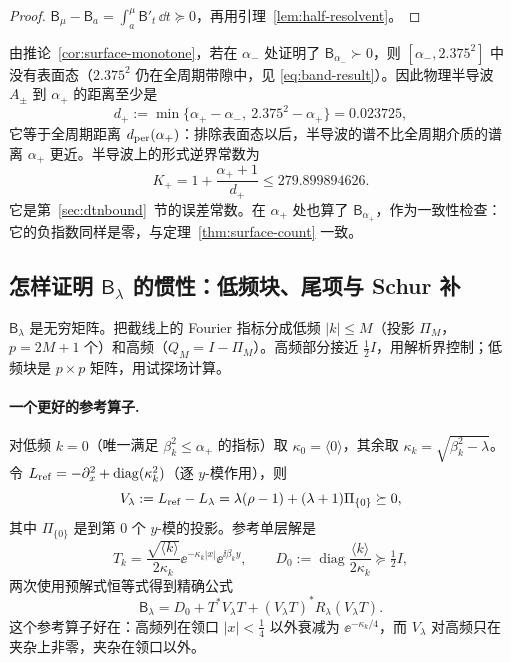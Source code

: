 \documentclass[11pt,a4paper,fontset=fandol]{ctexart}
\begin{document}
\begin{proof}
$\mathsf B_\mu-\mathsf B_a=\int_a^\mu\mathsf B'_t\,\dd t\succeq0$，再用引理~\ref{lem:half-resolvent}。
\end{proof}

由推论~\ref{cor:surface-monotone}，若在 $\alpha_-$ 处证明了 $\mathsf B_{\alpha_-}\succ0$，则 $[\alpha_-,2.375^2]$ 中没有表面态（$2.375^2$ 仍在全周期带隙中，见 \eqref{eq:band-result}）。因此物理半导波 $A_\pm$ 到 $\alpha_+$ 的距离至少是
\begin{equation}
\label{eq:dplus}
d_+:=\min\{\alpha_+-\alpha_-,\ 2.375^2-\alpha_+\}=0.023725,
\end{equation}
它等于全周期距离 $d_{\rm per}(\alpha_+)$：排除表面态以后，半导波的谱不比全周期介质的谱离 $\alpha_+$ 更近。半导波上的形式逆界常数为
\begin{equation}
\label{eq:Kplus}
K_+=1+\frac{\alpha_++1}{d_+}\le279.899894626 .
\end{equation}
它是第~\ref{sec:dtnbound}~节的误差常数。在 $\alpha_+$ 处也算了 $\mathsf B_{\alpha_+}$，作为一致性检查：它的负指数同样是零，与定理~\ref{thm:surface-count} 一致。

\subsection{怎样证明 $\mathsf B_\lambda$ 的惯性：低频块、尾项与 Schur 补}

$\mathsf B_\lambda$ 是无穷矩阵。把截线上的 Fourier 指标分成低频 $|k|\le M$（投影 $\Pi_M$，$p=2M+1$ 个）和高频（$Q_M=I-\Pi_M$）。高频部分接近 $\tfrac12I$，用解析界控制；低频块是 $p\times p$ 矩阵，用试探场计算。

\paragraph{一个更好的参考算子.} 对低频 $k=0$（唯一满足 $\beta_k^2\le\alpha_+$ 的指标）取 $\kappa_0=\langle0\rangle$，其余取 $\kappa_k=\sqrt{\beta_k^2-\lambda}$。令 $L_{\rm ref}=-\partial_x^2+\operatorname{diag}(\kappa_k^2)$（逐 $y$-模作用），则
\[
V_\lambda:=L_{\rm ref}-L_\lambda=\lambda(\rho-1)+(\lambda+1)\Pi_{\{0\}}\succeq0,
\]
其中 $\Pi_{\{0\}}$ 是到第 0 个 $y$-模的投影。参考单层解是
\[
T_k=\frac{\sqrt{\langle k\rangle}}{2\kappa_k}\ee^{-\kappa_k|x|}\ee^{\ii\beta_ky},\qquad D_0:=\operatorname{diag}\frac{\langle k\rangle}{2\kappa_k}\succeq\tfrac12I,
\]
两次使用预解式恒等式得到精确公式
\begin{equation}
\label{eq:B-exact}
\mathsf B_\lambda=D_0+T^*V_\lambda T+(V_\lambda T)^*R_\lambda(V_\lambda T).
\end{equation}
这个参考算子好在：高频列在领口 $|x|<\tfrac14$ 以外衰减为 $\ee^{-\kappa_k/4}$，而 $V_\lambda$ 对高频只在夹杂上非零，夹杂在领口以外。
\end{document}
